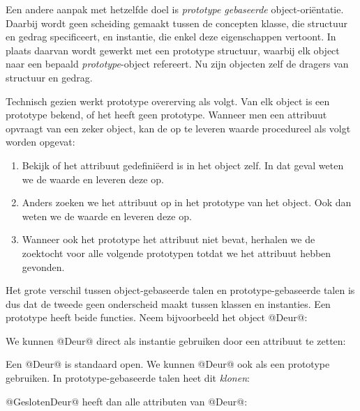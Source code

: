Een andere aanpak met hetzelfde doel is \emph{prototype gebaseerde} object-oriëntatie. Daarbij wordt geen scheiding gemaakt tussen de concepten klasse, die structuur en gedrag specificeert, en instantie, die enkel deze eigenschappen vertoont. In plaats daarvan wordt gewerkt met een prototype structuur, waarbij elk object naar een bepaald \emph{prototype}-object refereert. Nu zijn objecten zelf de dragers van structuur en gedrag.

Technisch gezien werkt prototype overerving als volgt. Van elk object is een prototype bekend, of het heeft geen prototype. Wanneer men een attribuut opvraagt van een zeker object, kan de op te leveren waarde procedureel als volgt worden opgevat:

\begin{enumerate}
  \item Bekijk of het attribuut gedefiniëerd is in het object zelf. In dat geval weten we de waarde en leveren deze op.
  \item Anders zoeken we het attribuut op in het prototype van het object. Ook dan weten we de waarde en leveren deze op.
  \item Wanneer ook het prototype het attribuut niet bevat, herhalen we de zoektocht voor alle volgende prototypen totdat we het attribuut hebben gevonden.
\end{enumerate}

Het grote verschil tussen object-gebaseerde talen en prototype-gebaseerde talen is dus dat de tweede geen onderscheid maakt tussen klassen en instanties. Een prototype heeft beide functies. Neem bijvoorbeeld het object @Deur@:

\newCodeFragment


We kunnen @Deur@ direct als instantie gebruiken door een attribuut te zetten:


Een @Deur@ is standaard open. We kunnen @Deur@ ook als een prototype gebruiken. In prototype-gebaseerde talen heet dit \emph{klonen}:


@GeslotenDeur@ heeft dan alle attributen van @Deur@:

